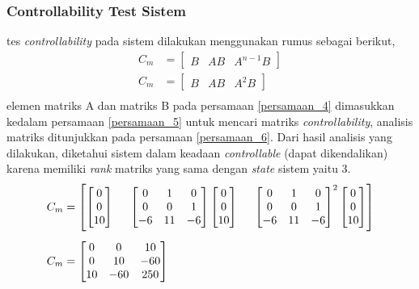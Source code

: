 \documentclass[../main.tex]{subfiles}
\begin{document}
            \subsubsection{Controllability Test Sistem}
                tes \textit{controllability} pada sistem dilakukan menggunakan rumus sebagai berikut,
                \begin{equation} 
                    \begin{split}
                        C_m &= \begin{bmatrix} B & AB & A^{n-1}B \end{bmatrix} \\[5pt]
                        C_m &= \begin{bmatrix} B & AB & A^2B \end{bmatrix} \\[5pt]
                        \label{persamaan_5}
                    \end{split}
                \end{equation}
                elemen matriks A dan matriks B pada persamaan \eqref{persamaan_4} dimasukkan kedalam persamaan \eqref{persamaan_5} untuk mencari matriks \textit{controllability}, analisis matriks ditunjukkan pada persamaan \eqref{persamaan_6}. Dari hasil analisis yang dilakukan, diketahui sistem dalam keadaan \textit{controllable} (dapat dikendalikan) karena memiliki \textit{rank} matriks yang sama dengan \textit{state} sistem yaitu $3$.
                \begin{equation}
                    \begin{split}
                        C_m &= \left[ \begin{bmatrix} 0 \\ 0 \\ 10 \end{bmatrix} \hspace{5mm} \begin{bmatrix} 0 & 1 & 0 \\ 0 & 0 & 1 \\ -6 & 11 & -6 \end{bmatrix} \begin{bmatrix} 0 \\ 0 \\ 10 \end{bmatrix} \hspace{5mm} \begin{bmatrix} 0 & 1 & 0 \\ 0 & 0 & 1 \\ -6 & 11 & -6 \end{bmatrix}^2 \begin{bmatrix} 0 \\ 0 \\ 10 \end{bmatrix} \right] \\[5pt]
                        C_m &= \begin{bmatrix} 0 & 0 & 10 \\ 0 & 10 & -60 \\ 10 & -60 & 250\end{bmatrix}
                        \label{persamaan_6}
                    \end{split}
                \end{equation}
\end{document}
